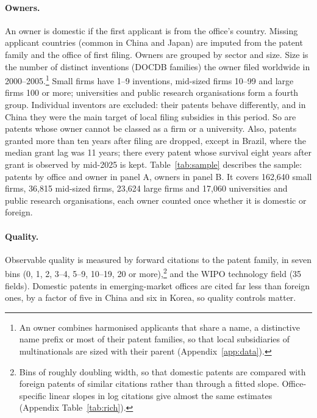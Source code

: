 \paragraph{Owners.} An owner is domestic if the first applicant is from the office's country. Missing applicant
countries (common in China and Japan) are imputed from the patent family and the office of first filing. Owners are
grouped by sector and size. Size is the number of distinct inventions (DOCDB families) the owner
filed worldwide in 2000--2005.\footnote{An owner combines harmonised applicants that share a name, a distinctive
name prefix or most of their patent families, so that local subsidiaries of multinationals are sized with their parent (Appendix~\ref{app:data}).} Small firms have 1--9
inventions, mid-sized firms 10--99 and large firms 100 or more; universities and public research organisations form a
fourth group. Individual inventors are excluded: their patents behave differently, and in China they were the main
target of local filing subsidies in this period. So are patents whose owner cannot be classed as a firm or a
university. Also, patents granted more than ten years after filing are dropped, except in Brazil, where the median
grant lag was 11 years; there every patent whose survival eight years after grant is observed by mid-2025 is kept.
Table~\ref{tab:sample} describes the sample: patents by office and owner in panel A, owners in panel B. It covers
162{,}640 small firms, 36{,}815 mid-sized firms, 23{,}624 large firms and 17{,}060 universities and public research
organisations, each owner counted once whether it is domestic or foreign.





\paragraph{Quality.} Observable quality is measured by forward citations to the patent family, in seven bins (0, 1, 2,
3--4, 5--9, 10--19, 20 or more),\footnote{Bins of roughly doubling width, so that domestic patents
are compared with foreign patents of similar citations rather than through a fitted slope. Office-specific linear
slopes in log citations give almost the same estimates (Appendix Table~\ref{tab:rich}).} and the WIPO technology field (35 fields). Domestic patents in emerging-market offices are cited far less than foreign
ones, by a factor of five in China and six in Korea, so quality controls matter.

